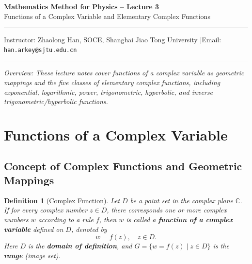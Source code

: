 \documentclass[11pt,a4paper]{article}
\theoremstyle{definitionbreak}
\newtheorem{definition}{Definition}
\theoremstyle{examplebreak}
\theoremstyle{plain}
\begin{document}
\begin{center}
    {\LARGE \textbf{Mathematics Method for Physics -- Lecture 3}} \\[0.4em]
    {\large Functions of a Complex Variable and Elementary Complex Functions}
\end{center}

\vspace{-0.4em}
\noindent\rule{\textwidth}{0.6pt}
\vspace{0.1em}

\begin{center}
    Instructor: Zhaolong Han, SOCE, Shanghai Jiao Tong University \quad|\quad Email: \texttt{han.arkey@sjtu.edu.cn}
\end{center}

\vspace{0.1em}
\noindent\rule{\textwidth}{0.6pt}

\vspace{0.5em}
\noindent \textit{Overview: These lecture notes cover functions of a complex variable as geometric mappings and the five classes of elementary complex functions, including exponential, logarithmic, power, trigonometric, hyperbolic, and inverse trigonometric/hyperbolic functions.}

\vspace{0.8em}

\section{Functions of a Complex Variable}

\subsection{Concept of Complex Functions and Geometric Mappings}

\begin{definition}[Complex Function]
Let $D$ be a point set in the complex plane $\mathbb{C}$. If for every complex number $z \in D$, there corresponds one or more complex numbers $w$ according to a rule $f$, then $w$ is called a \textbf{function of a complex variable} defined on $D$, denoted by
\[
    w = f(z), \quad z \in D.
\]
Here $D$ is the \textbf{domain of definition}, and $G = \{ w = f(z) \mid z \in D \}$ is the \textbf{range} (image set).
\end{definition}
\end{document}
